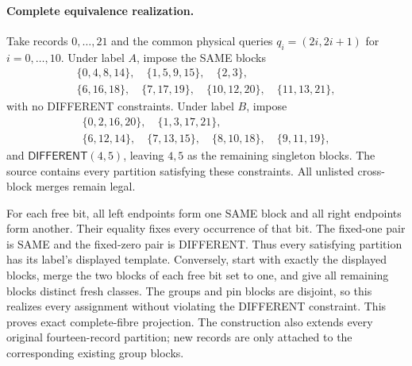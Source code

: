 \documentclass[pdflatex,sn-mathphys-num]{sn-jnl}
\newcommand{\DIFF}{\mathsf{DIFFERENT}}
\theoremstyle{thmstyleone}
\theoremstyle{thmstylethree}
\theoremstyle{thmstyletwo}
\begin{document}
\paragraph*{Complete equivalence realization.}
Take records $0,\ldots,21$ and the common physical queries
$q_i=(2i,2i+1)$ for $i=0,\ldots,10$. Under label $A$, impose the SAME blocks
\[
\begin{gathered}
 \{0,4,8,14\},\quad\{1,5,9,15\},\quad\{2,3\},\\
 \{6,16,18\},\quad\{7,17,19\},\quad
 \{10,12,20\},\quad\{11,13,21\},
\end{gathered}
\]
with no DIFFERENT constraints. Under label $B$, impose
\[
\begin{gathered}
 \{0,2,16,20\},\quad\{1,3,17,21\},\\
 \{6,12,14\},\quad\{7,13,15\},\quad
 \{8,10,18\},\quad\{9,11,19\},
\end{gathered}
\]
and $\DIFF(4,5)$, leaving $4,5$ as the remaining singleton blocks.
The source contains every partition satisfying these constraints.
All unlisted cross-block merges remain legal.

For each free bit, all left endpoints form one SAME block and all right
endpoints form another. Their equality fixes every occurrence of that bit.
The fixed-one pair is SAME and the fixed-zero pair is DIFFERENT. Thus every
satisfying partition has its label's displayed template. Conversely, start
with exactly the displayed blocks, merge the two blocks of each free bit set
to one, and give all remaining blocks distinct fresh classes. The groups and
pin blocks are disjoint, so this realizes every assignment without violating
the DIFFERENT constraint. This proves exact complete-fibre projection.
The construction also extends every original fourteen-record partition;
new records are only attached to the corresponding existing group blocks.
\end{document}
